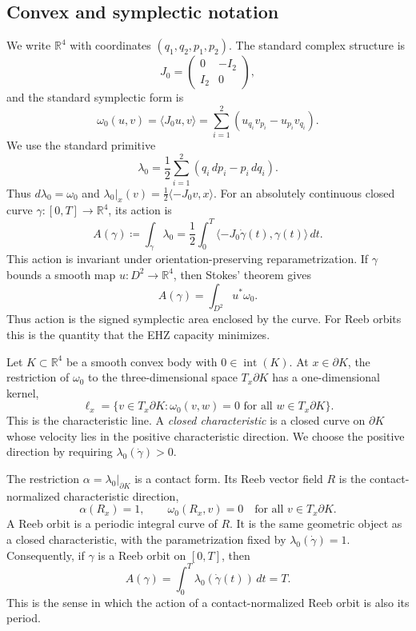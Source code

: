 \subsection{Convex and symplectic notation}\label{subsec:preliminaries-polytopes}

We write \(\mathbb{R}^4\) with coordinates \((q_1,q_2,p_1,p_2)\). The standard
complex structure is
\[
  J_0 =
  \begin{pmatrix}
    0 & -I_2 \\
    I_2 & 0
  \end{pmatrix},
\]
and the standard symplectic form is
\[
  \omega_0(u,v) = \langle J_0u,v\rangle
  = \sum_{i=1}^2 (u_{q_i}v_{p_i}-u_{p_i}v_{q_i}).
\]
We use the standard primitive
\[
  \lambda_0 = \frac{1}{2}\sum_{i=1}^2(q_i\,dp_i-p_i\,dq_i).
\]
Thus \(d\lambda_0=\omega_0\) and
\(\lambda_0|_x(v)=\frac12\langle -J_0v,x\rangle\).
For an absolutely continuous closed curve
\(\gamma\colon[0,T]\to\mathbb{R}^4\), its action is
\begin{equation}\label{eq:preliminaries-action}
  A(\gamma) \coloneqq \int_\gamma \lambda_0
  = \frac{1}{2}\int_0^T
    \langle -J_0\dot{\gamma}(t),\gamma(t)\rangle\,dt.
\end{equation}
This action is invariant under orientation-preserving reparametrization.
If \(\gamma\) bounds a smooth map \(u\colon D^2\to\mathbb{R}^4\), then Stokes'
theorem gives
\[
  A(\gamma)=\int_{D^2}u^*\omega_0.
\]
Thus action is the signed symplectic area enclosed by the curve. For Reeb
orbits this is the quantity that the EHZ capacity minimizes.

Let \(K\subset\mathbb{R}^4\) be a smooth convex body with
\(0\in\operatorname{int}(K)\). At \(x\in\partial K\), the restriction of
\(\omega_0\) to the three-dimensional space \(T_x\partial K\) has a
one-dimensional kernel,
\[
  \ell_x
  =
  \{v\in T_x\partial K:\omega_0(v,w)=0
    \text{ for all }w\in T_x\partial K\}.
\]
This is the characteristic line. A \emph{closed characteristic} is a closed
curve on \(\partial K\) whose velocity lies in the positive characteristic
direction. We choose the positive direction by requiring
\(\lambda_0(\dot{\gamma})>0\).

The restriction \(\alpha=\lambda_0|_{\partial K}\) is a contact form. Its Reeb
vector field \(R\) is the contact-normalized characteristic direction,
\[
  \alpha(R_x)=1,
  \qquad
  \omega_0(R_x,v)=0
  \quad\text{for all }v\in T_x\partial K.
\]
A Reeb orbit is a periodic integral curve of \(R\). It is the same geometric
object as a closed characteristic, with the parametrization fixed by
\(\lambda_0(\dot{\gamma})=1\). Consequently, if \(\gamma\) is a Reeb orbit on
\([0,T]\), then
\[
  A(\gamma)=\int_0^T\lambda_0(\dot{\gamma}(t))\,dt=T.
\]
This is the sense in which the action of a contact-normalized Reeb orbit is
also its period.
